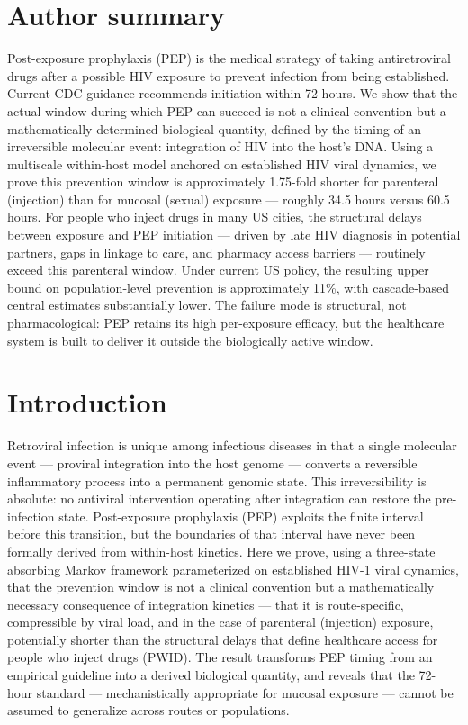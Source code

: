 \documentclass[10pt,letterpaper]{article}
\theoremstyle{definition}
\theoremstyle{remark}
\begin{document}
\section*{Author summary}
Post-exposure prophylaxis (PEP) is the medical strategy of taking antiretroviral drugs after a possible HIV exposure to prevent infection from being established. Current CDC guidance recommends initiation within 72 hours. We show that the actual window during which PEP can succeed is not a clinical convention but a mathematically determined biological quantity, defined by the timing of an irreversible molecular event: integration of HIV into the host's DNA. Using a multiscale within-host model anchored on established HIV viral dynamics, we prove this prevention window is approximately 1.75-fold shorter for parenteral (injection) than for mucosal (sexual) exposure --- roughly 34.5 hours versus 60.5 hours. For people who inject drugs in many US cities, the structural delays between exposure and PEP initiation --- driven by late HIV diagnosis in potential partners, gaps in linkage to care, and pharmacy access barriers --- routinely exceed this parenteral window. Under current US policy, the resulting upper bound on population-level prevention is approximately 11\%, with cascade-based central estimates substantially lower. The failure mode is structural, not pharmacological: PEP retains its high per-exposure efficacy, but the healthcare system is built to deliver it outside the biologically active window.



\section*{Introduction}

Retroviral infection is unique among infectious diseases in that a single molecular event --- proviral integration into the host genome --- converts a reversible inflammatory process into a permanent genomic state. This irreversibility is absolute: no antiviral intervention operating after integration can restore the pre-infection state. Post-exposure prophylaxis (PEP) exploits the finite interval before this transition, but the boundaries of that interval have never been formally derived from within-host kinetics. Here we prove, using a three-state absorbing Markov framework parameterized on established HIV-1 viral dynamics\cite{tanner2025,chun1995,siliciano2005}, that the prevention window is not a clinical convention but a mathematically necessary consequence of integration kinetics --- that it is route-specific, compressible by viral load, and in the case of parenteral (injection) exposure, potentially shorter than the structural delays that define healthcare access for people who inject drugs (PWID). The result transforms PEP timing from an empirical guideline into a derived biological quantity, and reveals that the 72-hour standard --- mechanistically appropriate for mucosal exposure --- cannot be assumed to generalize across routes or populations.
\end{document}
